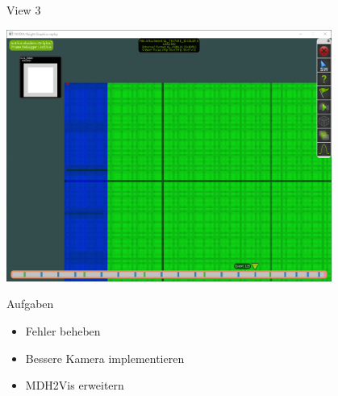 \documentclass{../presentation}
\begin{document}
\begin{frame}{View 3}
    \begin{center}
        \includegraphics[width=0.8\textwidth]{visualizer_3_zoom.png}
    \end{center}
\end{frame}

\begin{frame}{Aufgaben}
    \begin{itemize}
        \item Fehler beheben
        \item Bessere Kamera implementieren
        \item MDH2Vis erweitern
    \end{itemize}
\end{frame}
\end{document}
